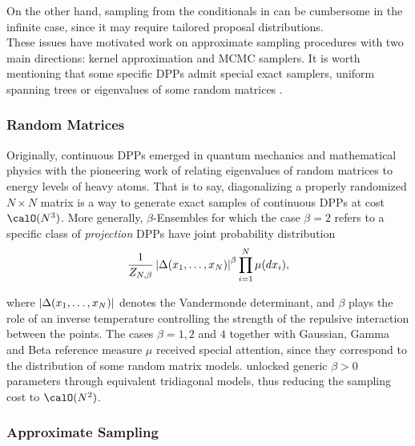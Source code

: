 \documentclass[twoside,11pt]{article}
\begin{document}
      On the other hand, sampling from the conditionals in  can be cumbersome in the infinite case, since it may require tailored proposal distributions.\\

      These issues have motivated work on approximate sampling procedures with two main directions: kernel approximation and MCMC samplers.
      It is worth mentioning that some specific DPPs admit special exact samplers, \eg uniform spanning trees \citep{PrWi98} or eigenvalues of some random matrices \citep{DuEd02}.


    \subsubsection{Random Matrices} %
    \label{ssub:random_matrices}

      Originally, continuous DPPs emerged in quantum mechanics and mathematical physics with the pioneering work of \citet{Wig67} relating eigenvalues of random matrices to energy levels of heavy atoms.
      That is to say, diagonalizing a properly randomized $N\times N$ matrix is a way to generate exact samples of continuous DPPs at cost $\calO(N^3)$.
      More generally, $\beta$-Ensembles for which the case $\beta=2$ refers to a specific class of \textit{projection} DPPs \citep{Kon05} have joint probability distribution
      \begin{equation}
        \frac{1}{Z_{N,\beta}}
        \left| \Delta(x_1,\dots,x_N) \right|^{\beta}
        \prod_{i= 1}^N
          \mu(d x_i),
      \end{equation}

      where $\left| \Delta(x_1,\dots,x_N) \right|$ denotes the Vandermonde determinant, and $\beta$ plays the role of an inverse temperature controlling the strength of the repulsive interaction between the points.
      The cases $\beta=1, 2$ and $4$ together with Gaussian, Gamma and Beta reference measure $\mu$ received special attention, since they correspond to the distribution of some random matrix models.
      \citet{DuEd02} unlocked generic $\beta>0$ parameters through equivalent tridiagonal models, thus reducing the sampling cost to $\calO(N^2)$.


    \subsubsection{Approximate Sampling} %
    \label{ssub:approximate_sampling}
\end{document}
